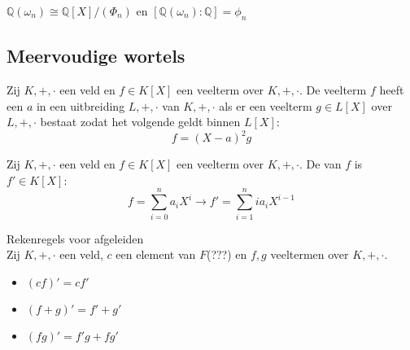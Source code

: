 \documentclass[main.tex]{subfiles}
\begin{document}
\begin{gev} $\mathbb{Q}(\omega_{n}) \cong \mathbb{Q}[X]/(\Phi_{n})$ en $[\mathbb{Q}(\omega_{n}):\mathbb{Q}] = \phi_{n}$ \zb
\end{gev}

\subsection{Meervoudige wortels}
\label{sec:meervoudige-wortels}

\begin{de}
  Zij $K,+,\cdot$ een veld en $f\in K[X]$ een veelterm over $K,+,\cdot$.
  De veelterm $f$ heeft een  $a$ in een uitbreiding $L,+,\cdot$ van $K,+,\cdot$ als er een veelterm $g\in L[X]$ over $L,+,\cdot$ bestaat zodat het volgende geldt binnen $L[X]$:
  \[ f = (X-a)^{2}g\]
\end{de}

\begin{de}
  Zij $K,+,\cdot$ een veld en $f\in K[X]$ een veelterm over $K,+,\cdot$.
  De  van $f$ is $f'\in K[X]$:
  \[ f= \sum_{i=0}^{n}a_{i}X^{i} \longrightarrow f' = \sum_{i=1}^{n}ia_{i}X^{i-1} \]
\end{de}

\begin{st}
  Rekenregels voor afgeleiden\\
  Zij $K,+,\cdot$ een veld, $c$ een element van $F$(???) en $f,g$ veeltermen over $K,+,\cdot$.
  \begin{itemize}
  \item $(cf)'= cf'$
  \item $(f+g)' = f'+g'$
  \item $(fg)' = f'g+ fg'$
  \end{itemize}
\end{st}
\end{document}
